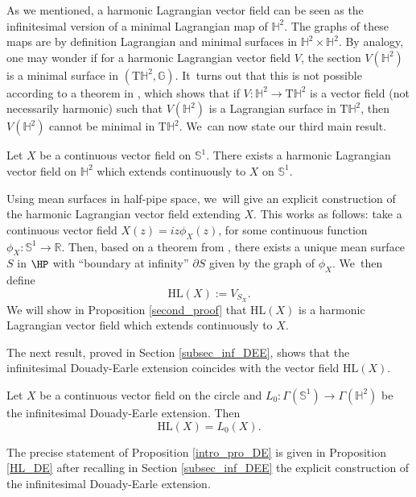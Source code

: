 As we mentioned, a harmonic Lagrangian vector field can be seen as the infinitesimal version of a minimal Lagrangian map of \(\mathbb{H}^2\). The graphs of these maps are by definition Lagrangian and minimal surfaces in \(\mathbb{H}^2 \times \mathbb{H}^2\). By analogy, one may wonder if for a harmonic Lagrangian vector field \(V\), the section \(V(\mathbb{H}^2)\) is a minimal surface in \((\mathrm{T}\mathbb{H}^2, \mathbb{G})\). It~turns out that this is not possible according to a theorem in \cite[Prop.\,2.2]{ML_in_tangent_bundle}, which shows that if \(V: \mathbb{H}^2 \to \mathrm{T}\mathbb{H}^2\) is a vector field (not necessarily harmonic) such that \(V(\mathbb{H}^2)\) is a Lagrangian surface in \(\mathrm{T}\mathbb{H}^2\), then \(V(\mathbb{H}^2)\) cannot be minimal in \(\mathrm{T}\mathbb{H}^2\). We~can now state our third main result.
\begin{theorem}\label{intro_ex_HL}
Let \(X\) be a continuous vector field on \(\mathbb{S}^1\). There exists a harmonic Lagrangian vector field on \(\mathbb{H}^2\) which extends continuously to \(X\) on \(\mathbb{S}^1\).
\end{theorem}
Using mean surfaces in half-pipe space, we~will give an explicit construction of the harmonic Lagrangian vector field extending \(X\). This works as follows: take a continuous vector field \(X(z) = iz\phi_X(z)\), for some continuous function \(\phi_X: \mathbb{S}^1 \to \mathbb{R}\). Then, based on a theorem from \cite{barbotfillastre}, there exists a unique mean surface \(S\) in \(\HP\) with ``boundary at infinity'' \(\partial S\) given by the graph of \(\phi_X\). We~then define
\begin{equation}\label{intro_HL}
\mathrm{HL}(X) := V_{S_X}.
\end{equation}
We will show in Proposition \ref{second_proof} that \(\mathrm{HL}(X)\) is a harmonic Lagrangian vector field which extends continuously to \(X\).

The next result, proved in Section \ref{subsec_inf_DEE}, shows that the infinitesimal Douady-Earle extension coincides with the vector field \(\mathrm{HL}(X)\).

\begin{prop}\label{intro_pro_DE}
Let \(X\) be a continuous vector field on the circle and \(L_0: \Gamma(\mathbb{S}^1) \to \Gamma(\mathbb{H}^2)\) be the infinitesimal Douady-Earle extension. Then
\[
\mathrm{HL}(X) = L_0(X).
\]
\end{prop}
The precise statement of Proposition \ref{intro_pro_DE} is given in Proposition \ref{HL_DE} after recalling in Section \ref{subsec_inf_DEE} the explicit construction of the infinitesimal Douady-Earle extension.

